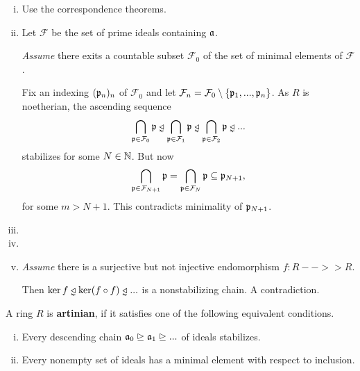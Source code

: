 	\begin{sketch}
		\begin{enumerate}[(i)]
			\item{
				Use the correspondence theorems.
			}
			\item{
				Let $\mathcal{F}$ be the set of prime ideals containing $\mathfrak{a}$.

				\textit{Assume} there exits a countable subset $\mathcal{F}_0$ of the set of minimal elements of $\mathcal{F}$.
				\begin{tab}[1.3cm]
					Fix an indexing $(\mathfrak{p}_n)_n$ of $\mathcal{F}_0$ and let $\mathcal{F}_n = \mathcal{F}_0 \setminus \{\mathfrak{p}_1,...,\mathfrak{p}_n\}$. As $R$ is noetherian, the ascending sequence
					\begin{equation*}
						\Intersection \limits_{\ideal{p} \in \mathcal{F}_0} \ideal{p} \divneq \Intersection \limits_{\ideal{p} \in \mathcal{F}_1} \ideal{p} \divneq \Intersection \limits_{\ideal{p} \in \mathcal{F}_2} \ideal{p} \divneq ...
					\end{equation*}
					stabilizes for some $N \in \mathbb{N}$. But now
					\begin{equation*}
						\bigcap \limits_{\mathfrak{p} \in \mathcal{F}_{N+1}} \mathfrak{p} = \bigcap \limits_{\mathfrak{p} \in \mathcal{F}_{N}} \mathfrak{p} \subseteq \mathfrak{p}_{N+1},
					\end{equation*}
					 for some $m > N+1$. This contradicts minimality of $\mathfrak{p}_{N+1}$.
				\end{tab}
			}
			\item{

			}
			\item{

			}
			\item{
				\textit{Assume} there is a surjective but not injective endomorphism $f:R-->>R$.
				\begin{tab}[1.3cm]
					Then $\ker f \divneq \ker (f\circ f) \divneq ...$ is a nonstabilizing chain. A contradiction.
				\end{tab}
			}\vspace{-1.8em}
		\end{enumerate}
	\end{sketch}

	\begin{definition}
		A ring $R$ is \textbf{artinian}, if it satisfies one of the following equivalent conditions.
		\begin{enumerate}[(i)]
			\item{
				Every descending chain $\mathfrak{a}_0 \trianglerighteq \mathfrak{a}_1 \trianglerighteq ...$ of ideals stabilizes.
			}
			\item{
				Every nonempty set of ideals has a minimal element with respect to inclusion.
			}
		\end{enumerate}
	\end{definition}

